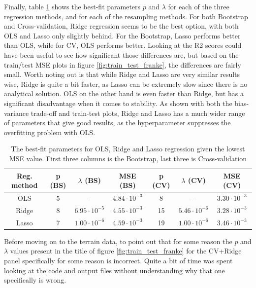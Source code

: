\documentclass[a4paper]{article}
\begin{document}
Finally, table \ref{tab:best_fit_franke} shows the best-fit parameters $p$ and $\lambda$ for each of the three regression methods, and for each of the resampling methods. For both Bootstrap and Cross-validation, Ridge regression seems to be the best option, with both OLS and Lasso only slightly behind. For the Bootstrap, Lasso performs better than OLS, while for CV, OLS performs better. Looking at the R2 scores could have been useful to see how significant those differences are, but based on the train/test MSE plots in figure \ref{fig:train_test_franke}, the differences are fairly small. Worth noting out is that while Ridge and Lasso are very similar results wise, Ridge is quite a bit faster, as Lasso can be extremely slow since there is no analytical solution. OLS on the other hand is even faster than Ridge, but has a significant disadvantage when it comes to stability. As shown with both the bias-variance trade-off and train-test plots, Ridge and Lasso has a much wider range of parameters that give good results, as the hyperparameter suppresses the overfitting problem with OLS.
\begin{table}[H]
  \centering
  \caption{The best-fit parameters for OLS, Ridge and Lasso regression given the lowest MSE value. First three columns is the Bootstrap, last three is Cross-validation}
  \label{tab:best_fit_franke}
  \begin{tabular}{c|c|c|c||c|c|c}
    Reg. method & p (BS)& $\lambda$ (BS) & MSE (BS) & p (CV) & $\lambda$ (CV) & MSE (CV) \\\hline
    OLS & 5 & - & $4.84\cdot10^{-3}$ & 8 & - & $3.30\cdot10^{-3}$\\
    Ridge & 8 & $6.95\cdot10^{-5}$ & $4.55\cdot10^{-3}$ & 15 & $5.46\cdot10^{-6}$ & $3.28\cdot10^{-3}$\\
    Lasso & 7 & $1.00\cdot10^{-6}$ &$4.59\cdot10^{-3}$ & 19 & $1.00\cdot10^{-6}$ & $3.46\cdot10^{-3}$
    \end{tabular}
\end{table}
Before moving on to the terrain data, to point out that for some reason the $p$ and $\lambda$ values present in the title of figure \ref{fig:train_test_franke} for the CV+Ridge panel specifically for some reason is incorrect. Quite a bit of time was spent looking at the code and output files without understanding why that one specifically is wrong.
\end{document}
